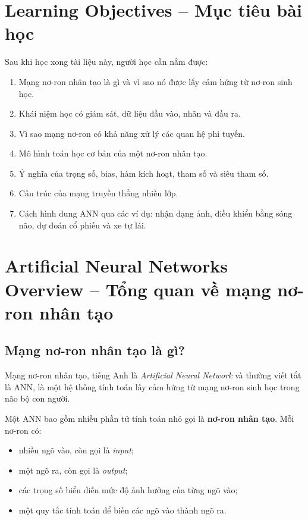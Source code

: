

\section*{Learning Objectives -- Mục tiêu bài học}

Sau khi học xong tài liệu này, người học cần nắm được:

\begin{enumerate}[label=\arabic*.]
    \item Mạng nơ-ron nhân tạo là gì và vì sao nó được lấy cảm hứng từ nơ-ron sinh học.
    \item Khái niệm học có giám sát, dữ liệu đầu vào, nhãn và đầu ra.
    \item Vì sao mạng nơ-ron có khả năng xử lý các quan hệ phi tuyến.
    \item Mô hình toán học cơ bản của một nơ-ron nhân tạo.
    \item Ý nghĩa của trọng số, bias, hàm kích hoạt, tham số và siêu tham số.
    \item Cấu trúc của mạng truyền thẳng nhiều lớp.
    \item Cách hình dung ANN qua các ví dụ: nhận dạng ảnh, điều khiển bằng sóng não, dự đoán cổ phiếu và xe tự lái.
\end{enumerate}

\section{Artificial Neural Networks Overview -- Tổng quan về mạng nơ-ron nhân tạo}

\subsection{Mạng nơ-ron nhân tạo là gì?}

Mạng nơ-ron nhân tạo, tiếng Anh là \textit{Artificial Neural Network} và thường viết tắt là ANN, là một hệ thống tính toán lấy cảm hứng từ mạng nơ-ron sinh học trong não bộ con người.

Một ANN bao gồm nhiều phần tử tính toán nhỏ gọi là \textbf{nơ-ron nhân tạo}. Mỗi nơ-ron có:

\begin{itemize}
    \item nhiều ngõ vào, còn gọi là \textit{input};
    \item một ngõ ra, còn gọi là \textit{output};
    \item các trọng số biểu diễn mức độ ảnh hưởng của từng ngõ vào;
    \item một quy tắc tính toán để biến các ngõ vào thành ngõ ra.
\end{itemize}

